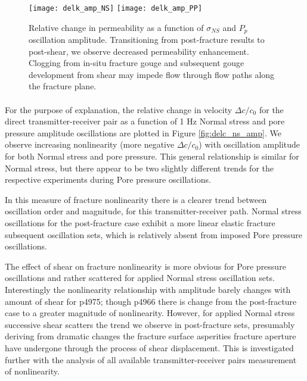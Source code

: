\clearpage

\begin{figure}[ht]
	\centering
	\texttt{[image: delk\_amp\_NS]}
	\texttt{[image: delk\_amp\_PP]}
	\caption{Relative change in permeability as a function of $ \sigma_{NS} $ and $ P_p $ oscillation amplitude. Transitioning from post-fracture results to post-shear, we observe decreased permeability enhancement. Clogging from in-situ fracture gouge and subsequent gouge development from shear may impede flow through flow paths along the fracture plane.}
	\label{fig:perm_ns_amp}
\end{figure}

\clearpage

\paragraph{}
For the purpose of explanation, the relative change in velocity $ \Delta c/c_0 $ for the direct transmitter-receiver pair as a function of 1 Hz Normal stress and pore pressure amplitude oscillations are plotted in Figure \ref{fig:delc_ns_amp}. We observe increasing nonlinearity (more negative $ \Delta c/c_0 $) with oscillation amplitude for both Normal stress and pore pressure. This general relationship is similar for Normal stress, but there appear to be two slightly different trends for the respective experiments during Pore pressure oscillations. 

In this measure of fracture nonlinearity there is a clearer trend between oscillation order and magnitude, for this transmitter-receiver path. Normal stress oscillations for the post-fracture case exhibit a more linear elastic fracture subsequent oscillation sets, which is relatively absent from imposed Pore pressure oscillations. 

The effect of shear on fracture nonlinearity is more obvious for Pore pressure oscillations and rather scattered for applied Normal stress oscillation sets. Interestingly the nonlinearity relationship with amplitude barely changes with amount of shear for p4975; though p4966 there is change from the post-fracture case to a greater magnitude of nonlinearity. However, for applied Normal stress successive shear scatters the trend we observe in post-fracture sets, presumably deriving from dramatic changes the fracture surface asperities fracture aperture have undergone through the process of shear displacement. This is investigated further with the analysis of all available transmitter-receiver pairs measurement of nonlinearity. 

